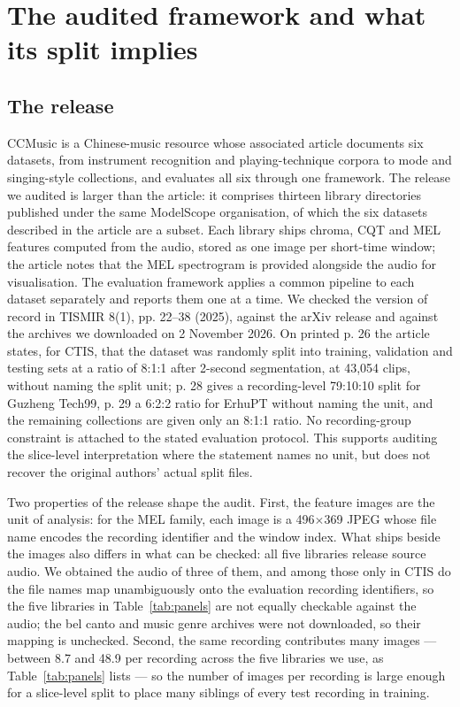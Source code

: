 \section{The audited framework and what its split implies}\label{sec:framework}

\subsection{The release}

CCMusic \citep{zhou2025ccmusic} is a Chinese-music resource whose associated article documents
six datasets, from instrument recognition and playing-technique corpora to mode and singing-style
collections, and evaluates all six
through one framework. The release we audited is larger than the article: it comprises thirteen
library directories published under the same ModelScope organisation, of which the six datasets
described in the article are a subset. Each library ships chroma, CQT and MEL features computed
from the audio, stored as one image per short-time window; the article notes that the MEL
spectrogram is provided alongside the audio for visualisation. The evaluation framework applies a common pipeline to
each dataset separately and reports them one at a time. We checked the version of
record in TISMIR 8(1), pp. 22--38 (2025), against the arXiv release and against the archives we
downloaded on 2 November 2026. On printed p. 26 the article states, for CTIS, that the dataset
was randomly split into training, validation and testing sets at a ratio of 8:1:1 after
2-second segmentation, at 43{,}054 clips, without naming the split unit; p. 28 gives a
recording-level 79:10:10 split for Guzheng Tech99, p. 29 a 6:2:2 ratio for ErhuPT without naming
the unit, and the remaining collections are given only an 8:1:1 ratio. No recording-group
constraint is attached to the stated evaluation protocol. This supports auditing the slice-level
interpretation where the statement names no unit, but does not recover the original authors'
actual split files.

Two properties of the release shape the audit. First, the feature images are the unit of
analysis: for the MEL family, each image is a 496$\times$369 JPEG whose file name encodes the
recording identifier and the window index. What ships beside the images also differs in what can
be checked: all five libraries release source audio. We obtained the audio of three of them, and
among those only in CTIS do the file names map unambiguously onto the evaluation recording
identifiers, so the five libraries in Table~\ref{tab:panels} are not equally checkable against
the audio; the bel canto and music genre archives were not downloaded, so their mapping is
unchecked. Second, the
same recording contributes many images --- between 8.7 and 48.9 per recording across the five
libraries we use, as Table~\ref{tab:panels} lists --- so the number of images per recording is large
enough for a slice-level split to place many siblings of every test recording in training.

